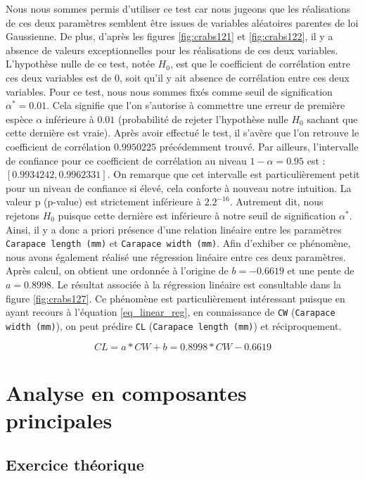 \documentclass{article}
\begin{document}
\begin{multicols}{2}
Nous nous sommes permis d'utiliser ce test car nous jugeons que les réalisations de ces deux paramètres semblent être issues de variables aléatoires parentes de loi Gaussienne. De plus, d'après les figures \ref{fig:crabs121} et \ref{fig:crabs122}, il y a absence de valeurs exceptionnelles pour les réalisations de ces deux variables. L'hypothèse nulle de ce test, notée $H_0$, est que le coefficient de corrélation entre ces deux variables est de $0$, soit qu'il y ait absence de corrélation entre ces deux variables. Pour ce test, nous nous sommes fixés comme seuil de signification $\alpha^{\ast} = 0.01$. Cela signifie que l'on s'autorise à commettre une erreur de première espèce $\alpha$ inférieure à $0.01$ (probabilité de rejeter l'hypothèse nulle $H_0$ sachant que cette dernière est vraie). Après avoir effectué le test, il s'avère que l'on retrouve le coefficient de corrélation $0.9950225$ précédemment trouvé. Par ailleurs, l'intervalle de confiance pour ce coefficient de corrélation au niveau $1-\alpha = 0.95$ est : $[0.9934242, 0.9962331]$. On remarque que cet intervalle est particulièrement petit pour un niveau de confiance si élevé, cela conforte à nouveau notre intuition. La valeur p (p-value) est strictement inférieure à $2.2^{-16}$. Autrement dit, nous rejetons $H_0$ puisque cette dernière est inférieure à notre seuil de signification $\alpha^{\ast}$. Ainsi, il y a donc a priori présence d'une relation linéaire entre les paramètres \texttt{Carapace length (mm)} et \texttt{Carapace width (mm)}. Afin d'exhiber ce phénomène, nous avons également réalisé une régression linéaire entre ces deux paramètres. Après calcul, on obtient une ordonnée à l'origine de $b = -0.6619$ et une pente de $a = 0.8998$.  Le résultat associée à la régression linéaire est consultable dans la figure \ref{fig:crabs127}. Ce phénomène est particulièrement intéressant puisque en ayant recours à l'équation \ref{eq_linear_reg}, en connaissance de \texttt{CW} (\texttt{Carapace width (mm)}), on peut prédire \texttt{CL} (\texttt{Carapace length (mm)}) et réciproquement. 

\begin{equation}
  \label{eq_linear_reg}
  CL = a * CW + b = 0.8998 * CW -0.6619
\end{equation}

\section{Analyse en composantes principales}

\subsection{Exercice théorique}


\end{multicols}
\end{document}
